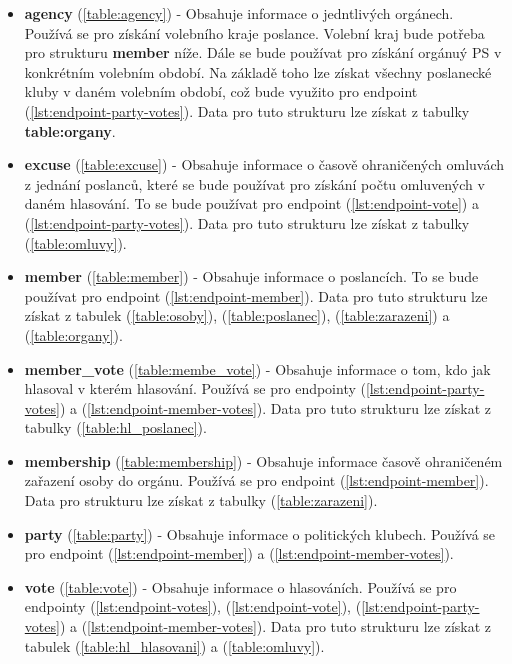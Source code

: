 \begin{itemize}
	\item \textbf{agency} (\ref{table:agency}) - Obsahuje informace o jedntlivých orgánech. Používá se pro získání volebního kraje poslance. Volební kraj bude potřeba pro strukturu \textbf{member} níže. Dále se bude používat pro získání orgánuý PS v konkrétním volebním období. Na základě toho lze získat všechny poslanecké kluby v daném volebním období, což bude využito pro endpoint (\ref{lst:endpoint-party-votes}). Data pro tuto strukturu lze získat z tabulky \textbf{table:organy}.
	

	\item \textbf{excuse} (\ref{table:excuse}) - Obsahuje informace o časově ohraničených omluvách z jednání poslanců, které se bude používat pro získání počtu omluvených v daném hlasování. To se bude používat pro endpoint (\ref{lst:endpoint-vote}) a (\ref{lst:endpoint-party-votes}). Data pro tuto strukturu lze získat z tabulky (\ref{table:omluvy}).
	
	\item \textbf{member} (\ref{table:member}) - Obsahuje informace o poslancích. To se bude používat pro endpoint (\ref{lst:endpoint-member}). Data pro tuto strukturu lze získat z tabulek (\ref{table:osoby}), (\ref{table:poslanec}), (\ref{table:zarazeni}) a (\ref{table:organy}).
	
	\item \textbf{member\_vote} (\ref{table:membe_vote}) - Obsahuje informace o tom, kdo jak hlasoval v kterém hlasování. Používá  se pro endpointy (\ref{lst:endpoint-party-votes}) a (\ref{lst:endpoint-member-votes}). Data pro tuto strukturu lze získat z tabulky (\ref{table:hl_poslanec}).
	
	\item \textbf{membership} (\ref{table:membership}) - Obsahuje informace časově ohraničeném zařazení osoby do orgánu. Používá se pro endpoint (\ref{lst:endpoint-member}). Data pro strukturu lze získat z tabulky (\ref{table:zarazeni}).
	
	\item \textbf{party} (\ref{table:party}) - Obsahuje informace o politických klubech. Používá se pro endpoint (\ref{lst:endpoint-member}) \linebreak a (\ref{lst:endpoint-member-votes}).
	
	\item \textbf{vote} (\ref{table:vote}) - Obsahuje informace o hlasováních. Používá se pro endpointy (\ref{lst:endpoint-votes}), (\ref{lst:endpoint-vote}), (\ref{lst:endpoint-party-votes}) a (\ref{lst:endpoint-member-votes}). Data pro tuto strukturu lze získat z tabulek (\ref{table:hl_hlasovani}) a (\ref{table:omluvy}).

\end{itemize}
